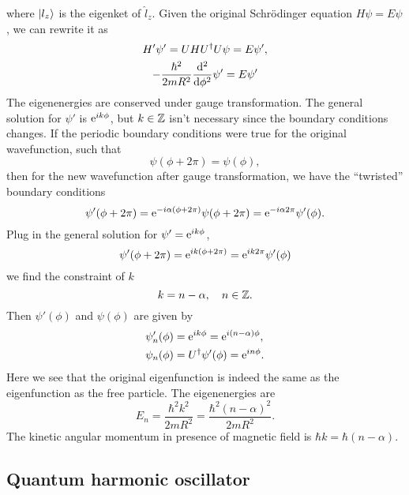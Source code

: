 \documentclass[10pt]{article}
\begin{document}
	where $\ket{l_z}$ is the eigenket of $\hat{l}_z$.
	Given the original Schr\"{o}dinger equation $H \psi = E \psi$, we can rewrite it as
	\begin{gather}
		H' \psi' = U H U^{\dagger} U \psi = E \psi', \\
		- \frac{\hbar^2}{2m R^2} \dv[2]{\phi} \psi' = E \psi'
	\end{gather}
	The eigenenergies are conserved under gauge transformation. The general solution for $\psi'$ is ${\mathrm{e}}^{i k \phi}$, but $k \in {\mathbb{Z}}$ isn't necessary since the boundary conditions changes.
	If the periodic boundary conditions were true for the original wavefunction, such that
	\begin{equation}
		\psi(\phi + 2\pi) = \psi(\phi),
	\end{equation}
	then for the new wavefunction after gauge transformation, we have the ``twristed'' boundary conditions
	\begin{equation}
		\psi'(\phi + 2 \pi) = {\mathrm{e}}^{-i \alpha(\phi + 2 \pi)} \psi(\phi + 2\pi) = {\mathrm{e}}^{-i\alpha 2\pi} \psi'(\phi).
	\end{equation}
	Plug in the general solution for $\psi' = {\mathrm{e}}^{i k \phi}$,
	\begin{equation}
		\psi'(\phi + 2\pi) = {\mathrm{e}}^{i k (\phi + 2\pi)} = {\mathrm{e}}^{i k 2\pi} \psi'(\phi)
	\end{equation}
	we find the constraint of $k$
	\begin{equation}
		k = n - \alpha, \quad n \in {\mathbb{Z}}.
	\end{equation}
	Then $\psi'(\phi)$ and $\psi(\phi)$ are given by
	\begin{align}
		\psi'_n(\phi) &= {\mathrm{e}}^{i k \phi} = {\mathrm{e}}^{i(n-\alpha)\phi}, \\
		\psi_n(\phi) &= U^{\dagger} \psi'(\phi) = {\mathrm{e}}^{in \phi}.
	\end{align}
	Here we see that the original eigenfunction is indeed the same as the eigenfunction as the free particle. The eigenenergies are
	\begin{equation}
		E_n = \frac{\hbar^2 k^2}{2mR^2} = \frac{\hbar^2 (n-\alpha)^2}{2mR^2}.
	\end{equation}
	The kinetic angular momentum in presence of magnetic field is $\hbar k = \hbar(n - \alpha)$.

	\subsection{Quantum harmonic oscillator}
\end{document}
